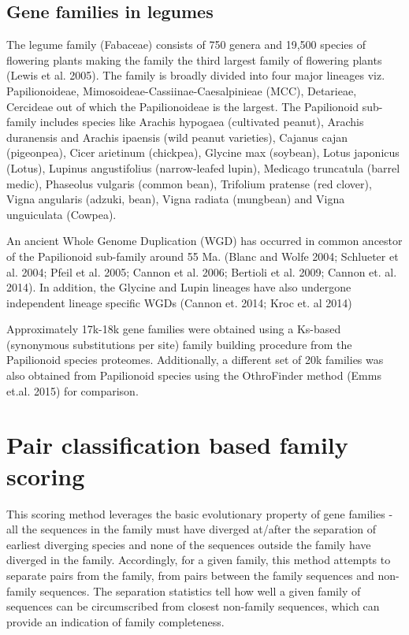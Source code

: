 \documentclass{article}
\begin{document}
		\subsection{Gene families in legumes}
		The legume family (Fabaceae) consists of 750 genera and 19,500 species of flowering plants making the family the third largest family of flowering plants (Lewis et al. 2005). The family is broadly divided into four major lineages viz. Papilionoideae, Mimosoideae-Cassiinae-Caesalpinieae (MCC), Detarieae, Cercideae out of which the Papilionoideae is the largest. The Papilionoid sub-family includes species like Arachis hypogaea (cultivated peanut), Arachis duranensis and Arachis ipaensis (wild peanut varieties), Cajanus cajan (pigeonpea), Cicer arietinum (chickpea), Glycine max (soybean), Lotus japonicus (Lotus), Lupinus angustifolius (narrow-leafed lupin), Medicago truncatula (barrel medic), Phaseolus vulgaris (common bean), Trifolium pratense (red clover), Vigna angularis (adzuki, bean), Vigna radiata (mungbean) and Vigna unguiculata (Cowpea).
		
		An ancient Whole Genome Duplication (WGD) has occurred in common ancestor of the Papilionoid sub-family around 55 Ma. (Blanc and Wolfe 2004; Schlueter et al. 2004; Pfeil et al. 2005; Cannon et al. 2006; Bertioli et al. 2009; Cannon et. al. 2014). In addition, the Glycine and Lupin lineages have also undergone independent lineage specific WGDs (Cannon et. 2014; Kroc et. al 2014) 
		
		Approximately 17k-18k gene families were obtained using a Ks-based (synonymous substitutions per site) family building procedure from the Papilionoid species proteomes. Additionally,  a different set of 20k families was also obtained from Papilionoid species using the OthroFinder method (Emms et.al. 2015) for comparison.
		\pagebreak
	\section{Pair classification based family scoring}
	This scoring method leverages the basic evolutionary property of gene families - all the sequences in the family must have diverged at/after the separation of earliest diverging species and none of the sequences outside the family have diverged in the family. Accordingly, for a given family, this method attempts to separate pairs from the family, from pairs between the family sequences and non-family sequences. The separation statistics tell how well a given family of sequences can be circumscribed from closest non-family sequences, which can provide an indication of family completeness.
\end{document}
